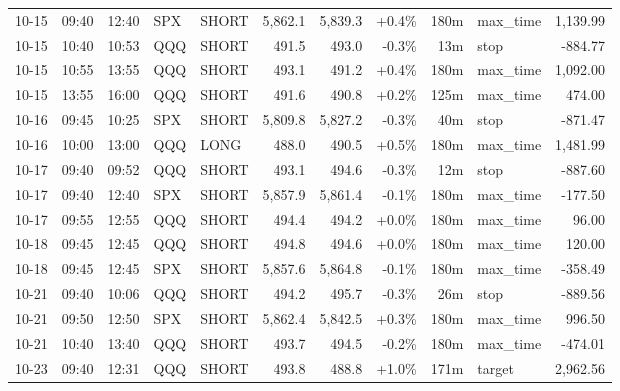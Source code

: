 \documentclass[11pt,a4paper,twoside]{article}
\begin{document}
\begin{center}
\begin{longtable}{>{\color{txtmain}}l l l l l r r r r >{\color{txtmain}}l r}
10-15 & 09:40 & 12:40 & SPX & SHORT & 5,862.1 & 5,839.3 & \textcolor{wingreen}{+0.4\%} & 180m & max\_time & \textcolor{wingreen}{1,139.99} \\
10-15 & 10:40 & 10:53 & QQQ & SHORT & 491.5 & 493.0 & \textcolor{lossred}{-0.3\%} & 13m & stop & \textcolor{lossred}{-884.77} \\
10-15 & 10:55 & 13:55 & QQQ & SHORT & 493.1 & 491.2 & \textcolor{wingreen}{+0.4\%} & 180m & max\_time & \textcolor{wingreen}{1,092.00} \\
10-15 & 13:55 & 16:00 & QQQ & SHORT & 491.6 & 490.8 & \textcolor{wingreen}{+0.2\%} & 125m & max\_time & \textcolor{wingreen}{474.00} \\
10-16 & 09:45 & 10:25 & SPX & SHORT & 5,809.8 & 5,827.2 & \textcolor{lossred}{-0.3\%} & 40m & stop & \textcolor{lossred}{-871.47} \\
10-16 & 10:00 & 13:00 & QQQ & LONG & 488.0 & 490.5 & \textcolor{wingreen}{+0.5\%} & 180m & max\_time & \textcolor{wingreen}{1,481.99} \\
10-17 & 09:40 & 09:52 & QQQ & SHORT & 493.1 & 494.6 & \textcolor{lossred}{-0.3\%} & 12m & stop & \textcolor{lossred}{-887.60} \\
10-17 & 09:40 & 12:40 & SPX & SHORT & 5,857.9 & 5,861.4 & \textcolor{lossred}{-0.1\%} & 180m & max\_time & \textcolor{lossred}{-177.50} \\
10-17 & 09:55 & 12:55 & QQQ & SHORT & 494.4 & 494.2 & \textcolor{wingreen}{+0.0\%} & 180m & max\_time & \textcolor{wingreen}{96.00} \\
10-18 & 09:45 & 12:45 & QQQ & SHORT & 494.8 & 494.6 & \textcolor{wingreen}{+0.0\%} & 180m & max\_time & \textcolor{wingreen}{120.00} \\
10-18 & 09:45 & 12:45 & SPX & SHORT & 5,857.6 & 5,864.8 & \textcolor{lossred}{-0.1\%} & 180m & max\_time & \textcolor{lossred}{-358.49} \\
10-21 & 09:40 & 10:06 & QQQ & SHORT & 494.2 & 495.7 & \textcolor{lossred}{-0.3\%} & 26m & stop & \textcolor{lossred}{-889.56} \\
10-21 & 09:50 & 12:50 & SPX & SHORT & 5,862.4 & 5,842.5 & \textcolor{wingreen}{+0.3\%} & 180m & max\_time & \textcolor{wingreen}{996.50} \\
10-21 & 10:40 & 13:40 & QQQ & SHORT & 493.7 & 494.5 & \textcolor{lossred}{-0.2\%} & 180m & max\_time & \textcolor{lossred}{-474.01} \\
10-23 & 09:40 & 12:31 & QQQ & SHORT & 493.8 & 488.8 & \textcolor{wingreen}{+1.0\%} & 171m & target & \textcolor{wingreen}{2,962.56} \\

\end{longtable}
\end{center}
\end{document}
